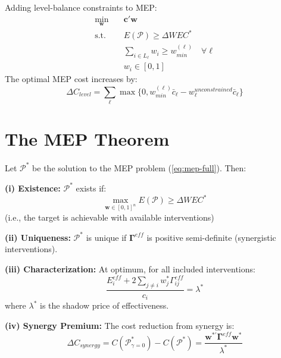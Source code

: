 \begin{proposition}
\label{prop:level-balanced}
Adding level-balance constraints to MEP:
\begin{equation}
\begin{aligned}
\min_{\mathbf{w}} \quad & \mathbf{c}'\mathbf{w} \\
\text{s.t.} \quad & E(\mathcal{P}) \geq \Delta WEC^* \\
& \sum_{i \in L_\ell} w_i \geq w_{min}^{(\ell)} \quad \forall \ell \\
& w_i \in [0, 1]
\end{aligned}
\end{equation}
The optimal MEP cost increases by:
\begin{equation}
\Delta C_{level} = \sum_{\ell} \max\{0, w_{min}^{(\ell)} \bar{c}_\ell - w_\ell^{unconstrained} \bar{c}_\ell\}
\end{equation}
\end{proposition}


\section{The MEP Theorem}
\label{sec:mep-theorem}

\begin{theorem}
\label{thm:mep}
Let $\mathcal{P}^*$ be the solution to the MEP problem (\ref{eq:mep-full}). Then:

\textbf{(i) Existence:} $\mathcal{P}^*$ exists if:
\begin{equation}
\max_{\mathbf{w} \in [0,1]^n} E(\mathcal{P}) \geq \Delta WEC^*
\end{equation}
(i.e., the target is achievable with available interventions)

\textbf{(ii) Uniqueness:} $\mathcal{P}^*$ is unique if $\boldsymbol{\Gamma}^{eff}$ is positive
semi-definite (synergistic interventions).

\textbf{(iii) Characterization:} At optimum, for all included interventions:
\begin{equation}
\frac{E_i^{eff} + 2\sum_{j \neq i} w_j^* \Gamma^{eff}_{ij}}{c_i} = \lambda^*
\end{equation}
where $\lambda^*$ is the shadow price of effectiveness.

\textbf{(iv) Synergy Premium:} The cost reduction from synergy is:
\begin{equation}
\Delta C_{synergy} = C(\mathcal{P}^*_{\gamma=0}) - C(\mathcal{P}^*) = \frac{\mathbf{w}^{*'}\boldsymbol{\Gamma}^{eff}\mathbf{w}^*}{\lambda^*}
\end{equation}
\end{theorem}

